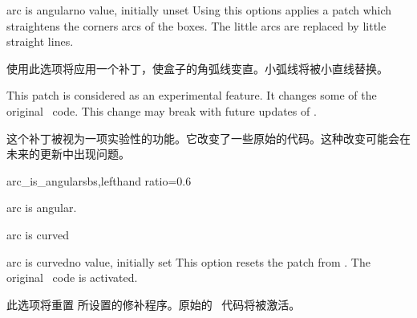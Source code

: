 \begin{docTcbKey}[][doc new=2015-05-05]{arc is angular}{}{no value, initially unset}
  Using this options applies a patch which straightens the corners arcs of
  the boxes. The little arcs are replaced by little straight lines.
  

  使用此选项将应用一个补丁，使盒子的角弧线变直。小弧线将被小直线替换。
  \begin{marker}
  This patch is considered as an experimental feature.
  It changes some of the original \tikzname\ code. This change may break
  with future updates of \tikzname.
  
  这个补丁被视为一项实验性的功能。它改变了一些原始的\tikzname 代码。这种改变可能会在未来的\tikzname 更新中出现问题。
  \end{marker}
  
\begin{exdispExample*}{arc_is_angular}{sbs,lefthand ratio=0.6}

\begin{tcolorbox}
arc is angular.
\end{tcolorbox}
\begin{tcolorbox}
arc is curved
\end{tcolorbox}
\end{exdispExample*}
  
  \end{docTcbKey}
  
  
\begin{docTcbKey}[][doc new=2015-05-05]{arc is curved}{}{no value, initially set}
This option resets the patch from . The
original \tikzname\ code is activated.


此选项将重置  所设置的修补程序。原始的 \tikzname\ 代码将被激活。
\end{docTcbKey}


